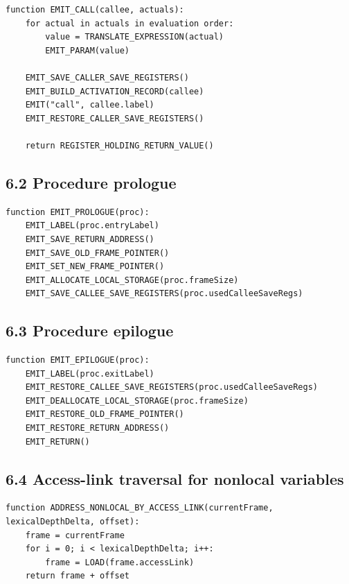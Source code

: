 \documentclass[10pt,letterpaper]{article}
\begin{document}
\begin{verbatim}
function EMIT_CALL(callee, actuals):
    for actual in actuals in evaluation order:
        value = TRANSLATE_EXPRESSION(actual)
        EMIT_PARAM(value)

    EMIT_SAVE_CALLER_SAVE_REGISTERS()
    EMIT_BUILD_ACTIVATION_RECORD(callee)
    EMIT("call", callee.label)
    EMIT_RESTORE_CALLER_SAVE_REGISTERS()

    return REGISTER_HOLDING_RETURN_VALUE()
\end{verbatim}

\subsection*{6.2 Procedure prologue}
{}

\begin{verbatim}
function EMIT_PROLOGUE(proc):
    EMIT_LABEL(proc.entryLabel)
    EMIT_SAVE_RETURN_ADDRESS()
    EMIT_SAVE_OLD_FRAME_POINTER()
    EMIT_SET_NEW_FRAME_POINTER()
    EMIT_ALLOCATE_LOCAL_STORAGE(proc.frameSize)
    EMIT_SAVE_CALLEE_SAVE_REGISTERS(proc.usedCalleeSaveRegs)
\end{verbatim}

\subsection*{6.3 Procedure epilogue}
{}

\begin{verbatim}
function EMIT_EPILOGUE(proc):
    EMIT_LABEL(proc.exitLabel)
    EMIT_RESTORE_CALLEE_SAVE_REGISTERS(proc.usedCalleeSaveRegs)
    EMIT_DEALLOCATE_LOCAL_STORAGE(proc.frameSize)
    EMIT_RESTORE_OLD_FRAME_POINTER()
    EMIT_RESTORE_RETURN_ADDRESS()
    EMIT_RETURN()
\end{verbatim}

\subsection*{6.4 Access-link traversal for nonlocal variables}
{}

\begin{verbatim}
function ADDRESS_NONLOCAL_BY_ACCESS_LINK(currentFrame, lexicalDepthDelta, offset):
    frame = currentFrame
    for i = 0; i < lexicalDepthDelta; i++:
        frame = LOAD(frame.accessLink)
    return frame + offset
\end{verbatim}
\end{document}
